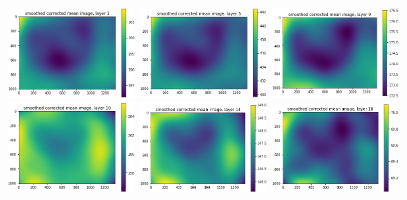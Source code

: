 \documentclass[letterpaper,11pt]{article}
\begin{document}
\begin{figure}[!ht]
\centering
\includegraphics[width=0.3\textwidth]{images/results/smoothed_corrected_mean_image_layers/smoothed_corrected_mean_image_layer_1}
\includegraphics[width=0.3\textwidth]{images/results/smoothed_corrected_mean_image_layers/smoothed_corrected_mean_image_layer_5}
\includegraphics[width=0.3\textwidth]{images/results/smoothed_corrected_mean_image_layers/smoothed_corrected_mean_image_layer_9}
\includegraphics[width=0.3\textwidth]{images/results/smoothed_corrected_mean_image_layers/smoothed_corrected_mean_image_layer_10}
\includegraphics[width=0.3\textwidth]{images/results/smoothed_corrected_mean_image_layers/smoothed_corrected_mean_image_layer_14}
\includegraphics[width=0.3\textwidth]{images/results/smoothed_corrected_mean_image_layers/smoothed_corrected_mean_image_layer_18}

\end{figure}
\end{document}
